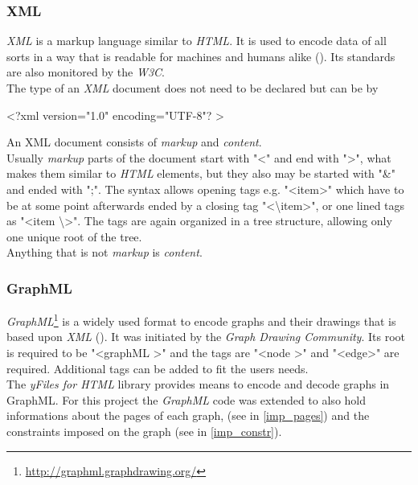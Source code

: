 \subsubsection{XML}
\textit{XML} is a markup language similar to \textit{HTML}. It is used to encode data of all sorts in a way that is readable for machines and humans alike (\cite{wiki-xml}). 
Its standards are also monitored by the \textit{W3C}.\\
The type of an \textit{XML} document does not need to be declared but can be by
\begin{center}
\textless  ?xml version="1.0" encoding="UTF-8"? \textgreater
\end{center}
An XML document consists of \textit{markup} and \textit{content}.\\
Usually \textit{markup} parts of the document start with "\textless " and end with "\textgreater", what makes them similar to \textit{HTML} elements, but they also may be started with "\&" and ended with ";". The syntax allows opening tags e.g. "\textless  item\textgreater" which have to be at some point afterwards ended by a closing tag "\textless  \textbackslash item\textgreater", or one lined tags as "\textless  item \textbackslash \textgreater". The tags are again organized in a tree structure, allowing only one unique root of the tree.\\
Anything that is not \textit{markup} is \textit{content}.
\subsubsection{GraphML}
\textit{GraphML}\footnote{\url{http://graphml.graphdrawing.org/}} is a widely used format to encode graphs and their drawings that is based upon \textit{XML} (\cite{wiki-graphml}). It was initiated by the \textit{Graph Drawing Community}. Its root is required to be "\textless  graphML \textgreater" and the tags are "\textless  node \textgreater" and "\textless  edge\textgreater" are required. Additional tags can be added to fit the users needs.\\
The \textit{yFiles for HTML} library provides means to encode and decode graphs in GraphML. For this project the \textit{GraphML} code was extended to also hold informations about the pages of each graph, (see in \autoref{imp_pages}) and the constraints imposed on the graph (see in \autoref{imp_constr}).
